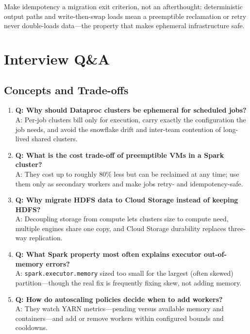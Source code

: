 \begin{tipbox}
Make idempotency a migration exit criterion, not an afterthought: deterministic output paths and write-then-swap loads mean a preemptible reclamation or retry never double-loads data---the property that makes ephemeral infrastructure safe.
\end{tipbox}

\section{Interview Q\&A}
\subsection{Concepts and Trade-offs}
\begin{enumerate}
    \item \textbf{Q: Why should Dataproc clusters be ephemeral for scheduled jobs?}\\
    A: Per-job clusters bill only for execution, carry exactly the configuration the job needs, and avoid the snowflake drift and inter-team contention of long-lived shared clusters.

    \item \textbf{Q: What is the cost trade-off of preemptible VMs in a Spark cluster?}\\
    A: They cost up to roughly 80\% less but can be reclaimed at any time; use them only as secondary workers and make jobs retry- and idempotency-safe.

    \item \textbf{Q: Why migrate HDFS data to Cloud Storage instead of keeping HDFS?}\\
    A: Decoupling storage from compute lets clusters size to compute need, multiple engines share one copy, and Cloud Storage durability replaces three-way replication.

    \item \textbf{Q: What Spark property most often explains executor out-of-memory errors?}\\
    A: \texttt{spark.executor.memory} sized too small for the largest (often skewed) partition---though the real fix is frequently fixing skew, not adding memory.

    \item \textbf{Q: How do autoscaling policies decide when to add workers?}\\
    A: They watch YARN metrics---pending versus available memory and containers---and add or remove workers within configured bounds and cooldowns.
\end{enumerate}

